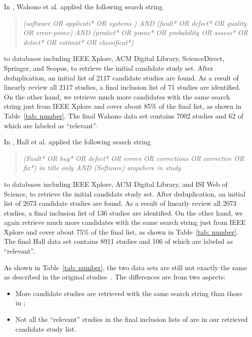 \documentclass[final,twocolumn,5p]{elsarticle}
\theoremstyle{break}
\begin{document}
In \cite{wahono2015systematic}, Wahono et al. applied the following search string
\begin{quote}\textit{(software OR applicati* OR systems ) AND (fault* OR
defect* OR quality OR error-prone) AND (predict*
OR prone* OR probability OR assess* OR detect* OR
estimat* OR classificat*)}
\end{quote}
to databases including IEEE Xplore, ACM Digital Library, ScienceDirect, Springer, and Scopus, to retrieve the initial candidate study set. After deduplication, an initial list of 2117 candidate studies are found. As a result of linearly review all 2117 studies, a final inclusion list of 71 studies are identified. On the other hand, we retrieve much more candidates with the same search string just from IEEE Xplore and cover about 85\% of the final list, as shown in Table~\ref{tab: number}. The final Wahono data set contains 7002 studies and 62 of which are labeled as ``relevant''.

In \cite{hall2012systematic}, Hall et al. applied the following search string
\begin{quote}{\em (Fault* OR bug* OR defect* OR errors OR corrections OR corrective OR fix*) \textit{in title only}
AND (Software) \textit{anywhere in study} }
\end{quote}
to databases including IEEE Xplore, ACM Digital Library, and ISI Web of Science, to retrieve the initial candidate study set. After deduplication, an initial list of 2073 candidate studies are found. As a result of linearly review all 2073 studies, a final inclusion list of 136 studies are identified. On the other hand, we again retrieve much more candidates with the same search string just from IEEE Xplore and cover about 75\% of the final list, as shown in Table~\ref{tab: number}. The final Hall data set contains 8911 studies and 106 of which are labeled as ``relevant''.

As shown in Table~\ref{tab: number}, the two data sets are still not exactly the same as described in the original studies~\cite{wahono2015systematic,hall2012systematic}. The differences are from two aspects: 

\begin{itemize}

\item
More candidate studies are retrieved with the same search string than those in \cite{wahono2015systematic,hall2012systematic};

\item
Not all the ``relevant'' studies in the final inclusion lists of \cite{wahono2015systematic,hall2012systematic} are in our retrieved candidate study list.

\end{itemize}
\end{document}
